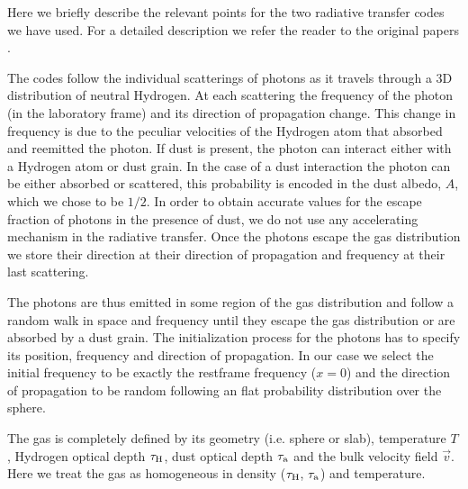\documentclass{emulateapj}
\newcommand{\ly}{{\ifmmode{{\rm Ly}\alpha~}\else{Ly$\alpha$~}\fi}}
\begin{document}
Here we briefly describe the relevant points for the two radiative
transfer codes we have used. For a detailed description we refer the
reader to the original papers \cite{CLARA,DijkstraKramer}.

The codes follow the individual scatterings of \ly photons as it
travels through a 3D distribution of neutral Hydrogen. At each
scattering the frequency of the photon (in the laboratory frame) and
its direction of propagation change. This change in frequency is due
to the peculiar velocities of the Hydrogen atom that absorbed and
reemitted the photon. If dust is present, the photon can interact
either with a Hydrogen atom or dust grain. In the case of a dust
interaction the photon can be either absorbed or scattered, this
probability is encoded in the dust albedo, $A$, which we chose to be
$1/2$. In order to obtain accurate values for the escape fraction of
photons in the presence of dust, we do not use any accelerating
mechanism in the radiative transfer. Once the photons escape the gas
distribution we store their direction at their direction of
propagation and frequency at their last scattering.

The photons are thus emitted in some region of the gas distribution
and follow a random walk in space and frequency until they escape the
gas distribution or are absorbed by a dust grain. The initialization
process for the \ly photons has to specify its position, frequency and
direction of propagation. In our case we select the initial frequency
to be exactly the \ly restframe frequency ($x=0$) and the direction of
propagation to be random following an flat probability distribution
over the sphere.


The gas is completely defined by its geometry (i.e. sphere or slab),
temperature $T$, Hydrogen optical depth $\tau_{\rm H}$, dust optical
depth $\tau_{\rm a}$ and the bulk velocity field $\vec{v}$. Here we
treat the gas as homogeneous in density ($\tau_{\rm H}$, $\tau_{\rm
a}$) and temperature.
\end{document}
